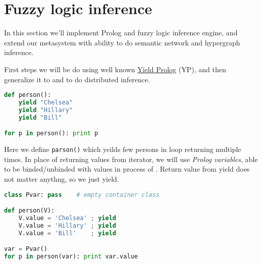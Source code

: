 \part{Fuzzy logic inference}

In this section we'll implement Prolog and fuzzy logic inference engine, and
extend our metasystem with ability to do semantic network and hypergraph
inference.

First steps we will be do using well known
\href{http://yieldprolog.sourceforge.net/}{Yield Prolog} (YP), and then
generalize it to  and  to do distributed
inference.

\begin{lstlisting}[language=Python]
def person():
    yield "Chelsea"
    yield "Hillary"
    yield "Bill"

for p in person(): print p
\end{lstlisting}
Here we define \verb|parson()|  which yeilds few
persons in loop returning  multiple times.
In place of returning values from iterator, we will use \emph{Prolog variables},
able to be binded/unbinded with values in process of . Return
value from yield does not matter anythng, so we just yield.

\begin{lstlisting}[language=Python]
class Pvar: pass    # empty container class

def person(V):
    V.value = 'Chelsea' ; yield
    V.value = 'Hillary' ; yield
    V.value = 'Bill'	; yield

var = Pvar()
for p in person(var): print var.value
\end{lstlisting}

